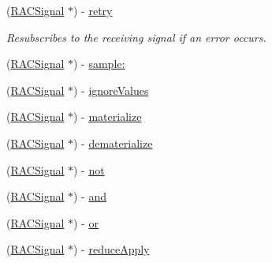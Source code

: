 \begin{DoxyCompactItemize}
\item 
\mbox{\label{category_r_a_c_signal_07_operations_08_a4fb19910fa59ca689d5f63bbd880e1e8}} 
(\mbox{\hyperlink{interface_r_a_c_signal}{R\+A\+C\+Signal}} $\ast$) -\/ \mbox{\hyperlink{category_r_a_c_signal_07_operations_08_a4fb19910fa59ca689d5f63bbd880e1e8}{retry}}
\begin{DoxyCompactList}\small\item\em Resubscribes to the receiving signal if an error occurs. \end{DoxyCompactList}\item 
(\mbox{\hyperlink{interface_r_a_c_signal}{R\+A\+C\+Signal}} $\ast$) -\/ \mbox{\hyperlink{category_r_a_c_signal_07_operations_08_a556702f113ba65f01fabf8363bd25e46}{sample\+:}}
\item 
(\mbox{\hyperlink{interface_r_a_c_signal}{R\+A\+C\+Signal}} $\ast$) -\/ \mbox{\hyperlink{category_r_a_c_signal_07_operations_08_a2997862d443d16efa3197facb6a354d1}{ignore\+Values}}
\item 
(\mbox{\hyperlink{interface_r_a_c_signal}{R\+A\+C\+Signal}} $\ast$) -\/ \mbox{\hyperlink{category_r_a_c_signal_07_operations_08_a2b970ec1845b139478ba31f00fe34b71}{materialize}}
\item 
(\mbox{\hyperlink{interface_r_a_c_signal}{R\+A\+C\+Signal}} $\ast$) -\/ \mbox{\hyperlink{category_r_a_c_signal_07_operations_08_aa5b197f63d89c698c8cbfc749ea15440}{dematerialize}}
\item 
(\mbox{\hyperlink{interface_r_a_c_signal}{R\+A\+C\+Signal}} $\ast$) -\/ \mbox{\hyperlink{category_r_a_c_signal_07_operations_08_a53de1c418b57ee4c60d20f561db04717}{not}}
\item 
(\mbox{\hyperlink{interface_r_a_c_signal}{R\+A\+C\+Signal}} $\ast$) -\/ \mbox{\hyperlink{category_r_a_c_signal_07_operations_08_a4a12f1ef58487260894d1ef37dbb9c9d}{and}}
\item 
(\mbox{\hyperlink{interface_r_a_c_signal}{R\+A\+C\+Signal}} $\ast$) -\/ \mbox{\hyperlink{category_r_a_c_signal_07_operations_08_aaf19b8314c8e554a7e5140ebffcd4f98}{or}}
\item 
(\mbox{\hyperlink{interface_r_a_c_signal}{R\+A\+C\+Signal}} $\ast$) -\/ \mbox{\hyperlink{category_r_a_c_signal_07_operations_08_a60241be15dba6de172d2ab14be09b657}{reduce\+Apply}}
\end{DoxyCompactItemize}
